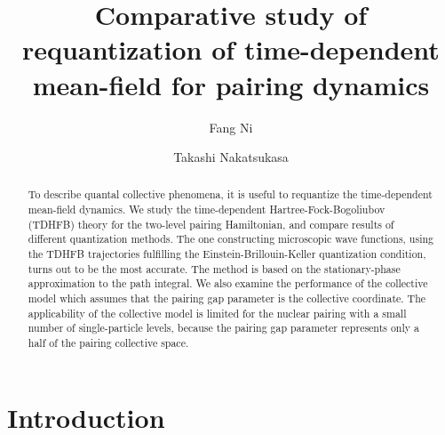\documentclass[%
superscriptaddress,
preprint,
showpacs,
nofootinbib,
amsmath,amssymb,
aps,
prc,
floatfix ]%
{revtex4-1}
\begin{document}
\renewcommand{\thefootnote}{\fnsymbol{footnote}}

\title{Comparative study of requantization of time-dependent mean-field
for pairing dynamics}
\author{Fang Ni}
\author{Takashi Nakatsukasa}


\begin{abstract}
To describe quantal collective phenomena, it is useful
to requantize the time-dependent mean-field dynamics.
We study the time-dependent Hartree-Fock-Bogoliubov (TDHFB) theory
for the two-level pairing Hamiltonian, and compare results
of different quantization methods.
The one constructing microscopic wave functions,
using the TDHFB trajectories fulfilling the
Einstein-Brillouin-Keller quantization condition,
turns out to be the most accurate.
The method is based on the stationary-phase approximation
to the path integral.
We also examine the performance of the collective model
which assumes that the pairing gap parameter is the collective coordinate.
The applicability of the collective model is limited
for the nuclear pairing with a small number of
single-particle levels,
because the pairing gap parameter represents only a half of the
pairing collective space.
\end{abstract}

\maketitle

\section{Introduction}
\end{document}
